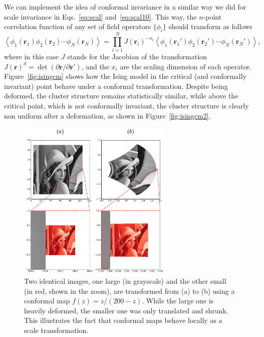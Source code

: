We can implement the idea of conformal invariance in a similar way we did
for scale invariance in Eqs.~\ref{eq:scal} and~\ref{eq:scal10}.
This way, the $n$-point correlation function of any set of field
operators $\{\phi_i\}$ should transform as follows
\begin{equation}
    \label{eq:cinv}
    \left\langle
        \phi_{1}\left(\mathbf{r}_{1}\right)
        \phi_{2}\left(\mathbf{r}_{2}\right)
        \cdots
        \phi_{N}\left(\mathbf{r}_{N}\right)
    \right\rangle =
    \prod_{i=1}^{N}J{\left(\mathbf{r}_{i}\right)}^{-x_{i}}
    \left\langle
        \phi_{1}\left(\mathbf{r}_{1}'\right)
        \phi_{2}\left(\mathbf{r}_{2}'\right)
        \cdots
        \phi_{N}\left(\mathbf{r}_{N}'\right)
    \right\rangle,
\end{equation}
where in this case $J$ stands for the Jacobian of the transformation
$J{\left(\mathbf{r}\right)}^{d}=
\det\left(\partial\mathbf{r}/\partial\mathbf{r}'\right)$, and the $x_i$ are the
scaling dimension of each operator. Figure~\ref{fig:isingcm} shows how the Ising
model in the critical (and conformally invariant) point behave under a conformal
transformation. Despite being deformed, the cluster structure remains
statistically similar, while above the critical point, which is not conformally
invariant, the cluster structure is clearly non uniform after a deformation, as
shown in Figure~\ref{fig:isingcm2}.

\begin{figure}
\begin{center}
    \includegraphics[width=0.66\textwidth]{chapters/ch3-conf/figs/lenna}
\end{center}
\caption{Two identical images, one large (in grayscale) and the other small (in
    red, shown in the zoom), are transformed from (a) to (b) using a conformal
    map $f(z)=z/(200-z)$. While the large one is heavily deformed, the smaller
    one was only translated and shrunk. This illustrates the fact that conformal
    maps behave locally as a scale transformation.}
\label{fig:lenna}
\end{figure}


